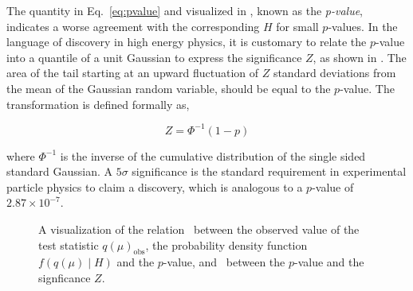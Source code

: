 The quantity in Eq.~\ref{eq:pvalue} and visualized in , known as the \textit{p-value}, indicates a worse agreement with the corresponding $H$ for small $p$-values. In the language of discovery in high energy physics, it is customary to relate the $p$-value into a quantile of a unit Gaussian to express the significance $Z$, as shown in . The area of the tail starting at an upward fluctuation of $Z$ standard deviations from the mean of the Gaussian random variable, should be equal to the $p$-value. The transformation is defined formally as, 

\begin{equation}
  Z = \Phi^{-1}(1-p)
\end{equation}

where $\Phi^{-1}$ is the inverse of the cumulative distribution of the single sided standard Gaussian. A $5\sigma$ significance is the standard requirement in experimental particle physics to claim a discovery, which is analogous to a $p$-value of $2.87 \times 10^{-7}$.

\begin{figure}
  \caption{A visualization of the relation~\protect{} between the observed value of the test statistic $q(\mu)_{\textrm{obs}}$, the probability density function $f(q(\mu)\mid H)$ and the $p$-value, and~\protect{} between the $p$-value and the signficance $Z$.}
  \label{fig:pvalues}
\end{figure}

